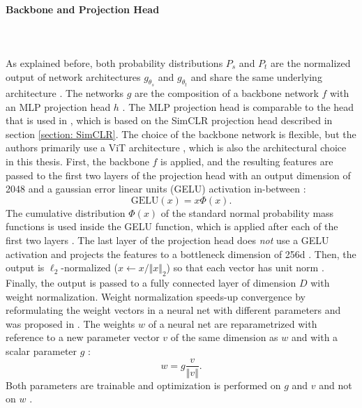 \paragraph{Backbone and Projection Head} \mbox{} \\
\\
As explained before, both probability distributions $P_s$ and $P_t$ are the normalized output of network architectures $g_{\theta_s}$ and $g_{\theta_t}$ and share the same underlying architecture \citep{Caron2021}.
The networks $g$ are the composition of a backbone network $f$ with an MLP projection head $h$ \citep{Caron2021}.
The MLP projection head is comparable to the head that is used in \citep{Caron2020}, which is based on the SimCLR projection head described in section \ref{section: SimCLR}.
The choice of the backbone network is flexible, but the authors primarily use a ViT architecture \citep{Dosovitskiy2020}, which is also the architectural choice in this thesis.
First, the backbone $f$ is applied, and the resulting features are passed to the first two layers of the projection head with an output dimension of 2048 and a gaussian error linear units (GELU) activation in-between \citep{Hendrycks2016b}:
\begin{equation}
\text{GELU}(x) = x \Phi(x).
\end{equation}
The cumulative distribution $\Phi(x)$ of the standard normal probability mass functions is used inside the GELU function, which is applied after each of the first two layers \citep{Hendrycks2016b}.
The last layer of the projection head does \textit{not} use a GELU activation and projects the features to a bottleneck dimension of 256d \citep{Caron2021}.
Then, the output is $\ell_2$-normalized ($x \leftarrow x/\Vert x \Vert_2$) so that each vector has unit norm \citep{Caron2021}.
Finally, the output is passed to a fully connected layer of dimension $D$ with weight normalization.
Weight normalization speeds-up convergence by reformulating the weight vectors in a neural net with different parameters and was proposed in \citep{Salimans2016}.
The weights $w$ of a neural net are reparametrized with reference to a new parameter vector $v$ of the same dimension as $w$ and with a scalar parameter $g$ \citep{Salimans2016}:
\begin{equation}
	w = g \frac{v}{\Vert v \Vert}.
\end{equation}
Both parameters are trainable and optimization is performed on $g$ and $v$ and not on $w$ \citep{Salimans2016}.
